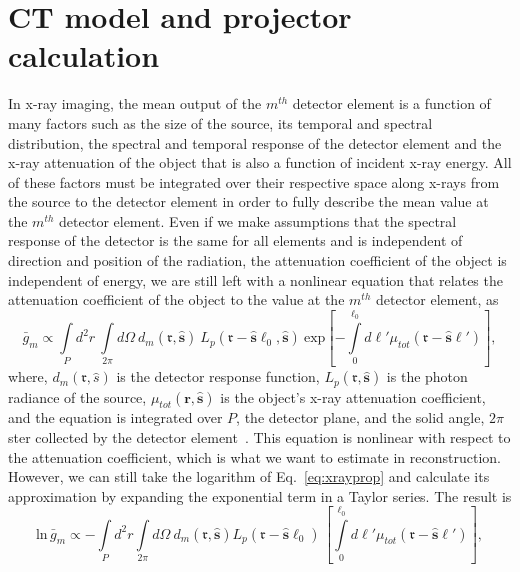 \section{CT model and projector calculation}
In x-ray imaging, the mean output of the $m^{th}$ detector element is a function of many factors such as the size of the source, its temporal and spectral distribution, the spectral and temporal response of the detector element and the x-ray attenuation of the object that is also a function of incident x-ray energy.  All of these factors must be integrated over their respective space along x-rays from the source to the detector element in order to fully describe the mean value at the $m^{th}$ detector element.  Even if we make assumptions that the spectral response of the detector is the same for all elements and is independent of direction and position of the radiation, the attenuation coefficient of the object is independent of energy, we are still left with a nonlinear equation that relates the attenuation coefficient of the object to the value at the $m^{th}$ detector element, as
%
\begin{equation}
\bar{g}_m \propto \int\limits_P d^2r \ \int\limits_{2 \pi} d \Omega \
	d_m(\mathbf{\mathfrak{r}}, \hat{\mathbf{s}}) \ L_p (\mathbf{\mathfrak{r}} - \hat{\mathbf{s}} \ell_0, \hat{\mathbf{s}}) \
	\mathrm{exp}\left[ -\int\limits_0^{\ell_0} d\ell' \mu_{tot}(\mathbf{\mathfrak{r}} - \hat{\mathbf{s}} \ell')\right],
\label{eq:xrayprop}
\end{equation}
%
where, $d_m(\mathbf{\mathfrak{r}}, \hat{s})$ is the detector response function, $L_p(\mathbf{\mathfrak{r}}, \hat{\mathbf{s}})$ is the photon radiance of the source, $\mu_{tot}(\mathfrak{\mathbf{r}}, \hat{\mathbf{s}})$ is the object's x-ray attenuation coefficient, and the equation is integrated over $P$, the detector plane, and the solid angle, $2 \pi$ ster collected by the detector element~\citep{Barrett2004}.  This equation is nonlinear with respect to the attenuation coefficient, which is what we want to estimate in reconstruction.  However, we can still take the logarithm of Eq.~\ref{eq:xrayprop} and calculate its approximation by expanding the exponential term in a Taylor series.  The result is 
%
\begin{equation}
\mathrm{ln} \, \bar{g}_m \propto -\int\limits_P d^2r \int\limits_{2 \pi}
d \Omega \ d_m( \mathbf{\mathfrak{r}}, \hat{\mathbf{s}} )
L_p (\mathbf{\mathfrak{r}} - \hat{\mathbf{s}} \ell_0) \,
\left[ \int\limits_0^{\ell_0} d\ell' \mu_{tot}(\mathbf{\mathfrak{r}} - \hat{\mathbf{s}} \ell')\right],
\label{eq:xrayprop_approx1}
\end{equation}
